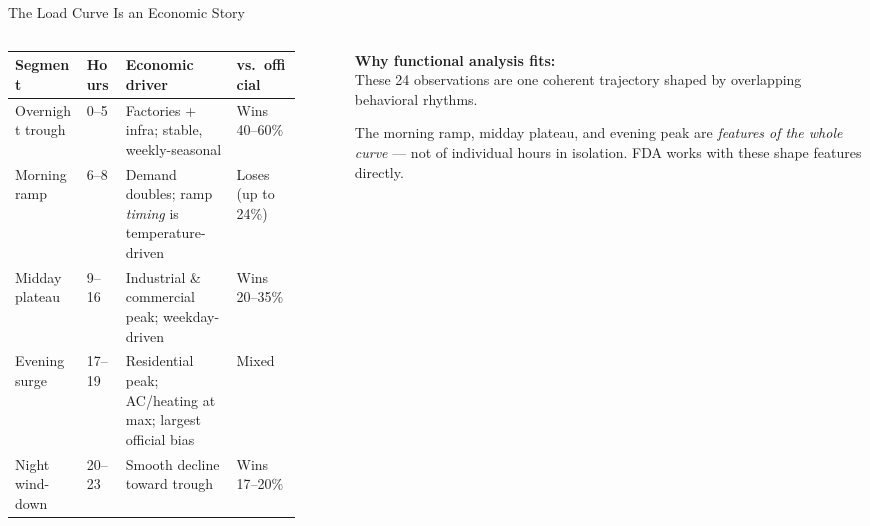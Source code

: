 \documentclass[10pt,aspectratio=169]{beamer}
\begin{document}
\begin{frame}{The Load Curve Is an Economic Story}
  \begin{columns}
    \begin{column}{0.62\textwidth}
      \small
      \renewcommand{\arraystretch}{1.25}
      \begin{tabular}{p{0.22\linewidth}p{0.12\linewidth}p{0.34\linewidth}p{0.20\linewidth}}
        \toprule
        Segment & Hours & Economic driver & vs.\ official \\
        \midrule
        \rowcolor{midgray}
        Overnight trough
          & 0--5
          & Factories + infra; stable, weekly-seasonal
          & \textcolor{accentblue}{Wins 40--60\%} \\
        \rowcolor{loserose}
        Morning ramp
          & 6--8
          & Demand doubles; ramp \emph{timing} is temperature-driven
          & \textcolor{accentred}{Loses (up to 24\%)} \\
        \rowcolor{midgray}
        Midday plateau
          & 9--16
          & Industrial \& commercial peak; weekday-driven
          & \textcolor{accentblue}{Wins 20--35\%} \\
        \rowcolor{loserose}
        Evening surge
          & 17--19
          & Residential peak; AC/heating at max; largest official bias
          & \textcolor{accentred}{Mixed} \\
        \rowcolor{midgray}
        Night wind-down
          & 20--23
          & Smooth decline toward trough
          & \textcolor{accentblue}{Wins 17--20\%} \\
        \bottomrule
      \end{tabular}
    \end{column}
    \begin{column}{0.35\textwidth}
      \small
      \textbf{Why functional analysis fits:}\\[0.4em]
      These 24 observations are one coherent trajectory shaped by
      overlapping behavioral rhythms.

      \vspace{0.4em}
      The morning ramp, midday plateau, and evening peak are
      \emph{features of the whole curve} --- not of individual hours
      in isolation. FDA works with these shape features directly.


\end{column}
\end{columns}
\end{frame}
\end{document}
